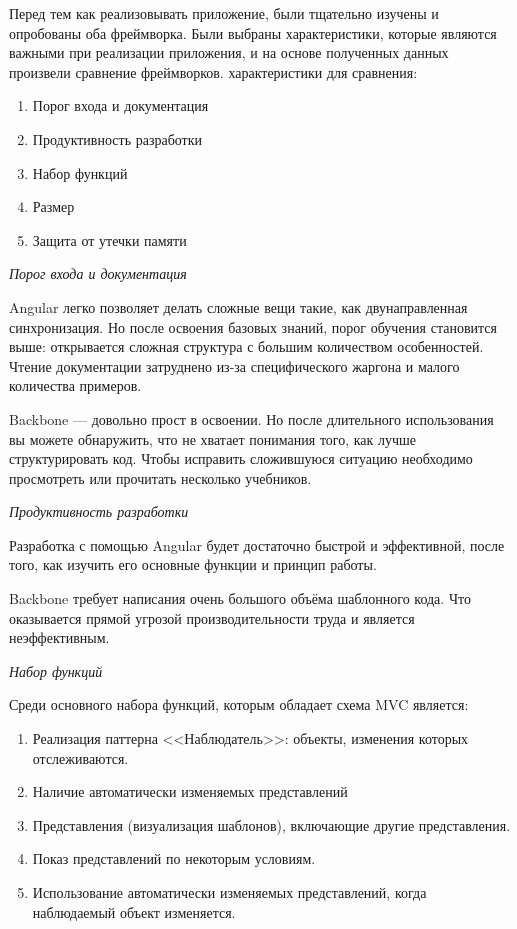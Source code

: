 
Перед тем как реализовывать приложение, были тщательно изучены и опробованы оба фреймворка. Были выбраны характеристики, которые являются важными при реализации приложения, и на основе полученных данных произвели сравнение фреймворков. характеристики для сравнения:
\begin {enumerate}
\item Порог входа и документация
\item Продуктивность разработки
\item Набор функций
\item Размер 
\item Защита от утечки памяти 
\end {enumerate}

{\itshape Порог входа и документация}

Angular легко позволяет делать сложные вещи такие, как двунаправленная синхронизация. Но после освоения базовых знаний, порог обучения становится выше: открывается сложная структура с большим количеством особенностей. Чтение документации затруднено из-за специфического жаргона и малого количества примеров.

Backbone — довольно прост в освоении. Но после длительного использования вы можете обнаружить, что не хватает понимания того, как лучше структурировать код. Чтобы исправить сложившуюся ситуацию необходимо просмотреть или прочитать несколько учебников. 

{\itshape Продуктивность разработки}

Разработка с помощью Angular будет достаточно быстрой и эффективной, после того, как изучить его основные функции и принцип работы.

Backbone требует написания очень большого объёма шаблонного кода. Что оказывается прямой угрозой производительности труда и является неэффективным.

{\itshape Набор функций}

Среди основного набора функций, которым обладает схема MVC является:
\begin{enumerate}
\item Реализация паттерна <<Наблюдатель>>: объекты, изменения которых отслеживаются.
\item  Наличие автоматически изменяемых представлений
\item Представления (визуализация шаблонов), включающие другие представления.
\item Показ представлений по некоторым условиям.
\item Использование автоматически изменяемых представлений, когда наблюдаемый объект изменяется.
\end{enumerate}

